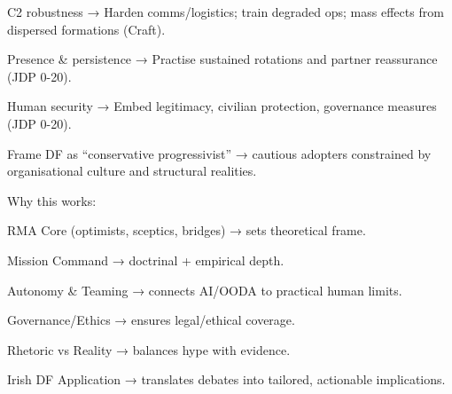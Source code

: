 C2 robustness → Harden comms/logistics; train degraded ops; mass effects from dispersed formations (Craft).

Presence \& persistence → Practise sustained rotations and partner reassurance (JDP 0-20).

Human security → Embed legitimacy, civilian protection, governance measures (JDP 0-20).

Frame DF as “conservative progressivist” → cautious adopters constrained by organisational culture and structural realities.

 Why this works:

RMA Core (optimists, sceptics, bridges) → sets theoretical frame.

Mission Command → doctrinal + empirical depth.

Autonomy \& Teaming → connects AI/OODA to practical human limits.

Governance/Ethics → ensures legal/ethical coverage.

Rhetoric vs Reality → balances hype with evidence.

Irish DF Application → translates debates into tailored, actionable implications.